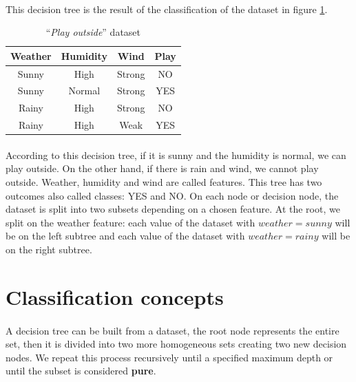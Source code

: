 \documentclass[12pt]{report}
\theoremstyle{definition}
\theoremstyle{definition}
\theoremstyle{definition}
\begin{document}
\paragraph{} This decision tree is the result of the classification of the dataset in figure \ref{fig:dataweather}.

\begin{table}[ht]
    \centering
    \begin{tabular}{||c c c c||} 
    \hline
    Weather & Humidity & Wind & Play\\[0.5ex]
    \hline\hline
    Sunny & High & Strong & NO\\ 
    Sunny & Normal & Strong & YES\\
    Rainy & High & Strong & NO\\
    Rainy & High & Weak & YES\\ 
    \hline
    \end{tabular}
    \caption{``\textit{Play outside}'' dataset}
    \label{fig:dataweather}
\end{table}

\paragraph{} According to this decision tree, if it is sunny and the humidity is normal, we can play outside.
On the other hand, if there is rain and wind, we cannot play outside. Weather, humidity and wind are called
features. This tree has two outcomes also called classes: YES and NO. On each node or decision node, the dataset
is split into two subsets depending on a chosen feature. At the root, we split on the weather feature: each
value of the dataset with $weather = sunny$ will be on the left subtree and each value of the dataset with
$weather = rainy$ will be on the right subtree.


\section{Classification concepts}
\paragraph{} A decision tree can be built from a dataset, the root node represents the entire set, then it is
divided into two more homogeneous sets creating two new decision nodes. We repeat this process recursively
until a specified maximum depth or until the subset is considered \textbf{pure}.
\end{document}
